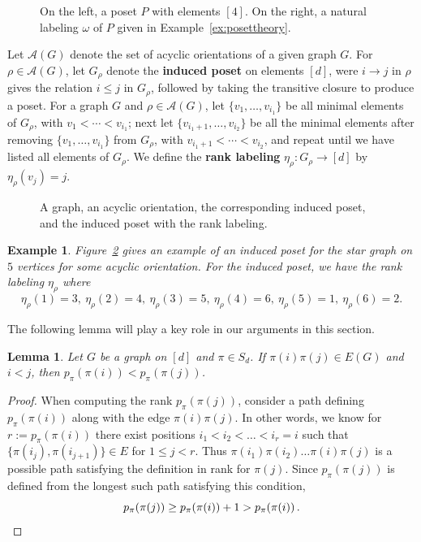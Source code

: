 \documentclass[11pt]{amsart}
\newtheorem{lemma}[theorem]{Lemma}
\newtheorem{exam}{Example}
\newenvironment{example}{\begin{exam}\sf}{\end{exam}}
\newcommand\Def[1]{{\bf #1}}
\newcommand{\rk}[1][\pi]{p_{#1}}
\newcommand{\acyclic}[1]{\mathcal{A}(#1)}
\begin{document}
\begin{figure}
    \centering
    
    \caption{On the left, a poset $P$ with elements $[4]$. On the right, a natural labeling $\omega$ of $P$ given in Example~\ref{ex:posettheory}.}
    \label{fig:posettheory}
\end{figure}

Let $\acyclic{G}$ denote the set of acyclic orientations of a given graph $G$. For $\rho \in \acyclic{G}$, let
$G_\rho$ denote the \Def{induced poset} on elements $[d]$, were $i \to j$ in $\rho$ gives the relation $i \leq
j$ in $G_\rho$, followed by taking the transitive closure to produce a poset.
For a graph $G$ and $\rho \in \acyclic{G}$, let $\{v_1,\ldots,v_{i_1}\}$ be all minimal elements of $G_\rho$,
with $v_1 < \cdots < v_{i_1}$; next let $\{v_{i_1+1},\ldots,v_{i_2} \}$ be all the minimal elements after
removing $\{v_1,\ldots,v_{i_1}\}$ from $G_\rho$, with $v_{i_1+1} < \cdots < v_{i_2}$, and repeat until we have listed all elements of $G_\rho$. We define the \Def{rank labeling} $\eta_\rho:G_\rho \to [d]$ by $\eta_\rho(v_j)=j$.

\begin{figure}
    \centering
    
    \caption{A graph, an acyclic orientation, the corresponding induced poset, and the induced poset with the
rank labeling.}
    \label{fig:inducedposet}
\end{figure}

\begin{example}
    Figure~\ref{fig:inducedposet} gives an example of an induced poset for the star graph on $5$ vertices for
some acyclic orientation. For the induced poset, we have the rank labeling $\eta_\rho$ where 
    \[
        \eta_\rho(1)=3, \ \eta_\rho(2)=4, \ \eta_\rho(3)=5, \ \eta_\rho(4)=6, \ \eta_\rho(5)=1, \ \eta_\rho(6)=2.
    \]
\end{example}

The following lemma will play a key role in our arguments in this section.
\begin{lemma}\label{lem:edgerank}
    Let $G$ be a graph on $[d]$ and $\pi \in S_d$. If $\pi(i) \pi(j) \in E(G)$ and $i <j$, then $\rk(\pi(i))<\rk(\pi(j))$.
\end{lemma}
\begin{proof}
    When computing the rank $\rk(\pi(j))$, consider a path defining $\rk(\pi(i))$ along with the edge $\pi(i)\pi(j)$. 
    In other words, we know for $r := \rk(\pi(i))$ there exist positions $i_1 < i_2 < \dots < i_r = i$ such that $\{\pi(i_j), \pi(i_{j+1}) \} \in E$ for $1 \le j < r$.
    Thus $\pi(i_1) \pi(i_2) \ldots \pi(i) \pi(j)$ is a possible path satisfying the definition in rank for $\pi(j)$. 
    Since $\rk(\pi(j))$ is defined from the longest such path satisfying this condition, 
    \[
        \rk(\pi(j)) \geq \rk(\pi(i))+1 > \rk(\pi(i)) \, . \qedhere 
    \] 
\end{proof}
\end{document}
